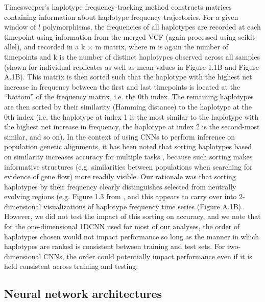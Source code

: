 Timesweeper’s haplotype frequency-tracking method constructs matrices containing information about haplotype frequency trajectories. For a given window of $l$ polymorphisms, the frequencies of all haplotypes are recorded at each timepoint using information from the merged VCF (again processed using scikit-allel), and recorded in a k × m matrix, where m is again the number of timepoints and k is the number of distinct haplotypes observed across all samples (shown for individual replicates as well as mean values in Figure 1.1B and Figure A.1B). This matrix is then sorted such that the haplotype with the highest net increase in frequency between the first and last timepoints is located at the “bottom” of the frequency matrix, i.e. the 0th index. The remaining haplotypes are then sorted by their similarity (Hamming distance) to the haplotype at the 0th index (i.e. the haplotype at index 1 is the most similar to the haplotype with the highest net increase in frequency, the haplotype at index 2 is the second-most similar, and so on). In the context of using CNNs to perform inference on population genetic alignments, it has been noted that sorting haplotypes based on similarity increases accuracy for multiple tasks \cite{flagelUnreasonableEffectivenessConvolutional2019,rayIntroUNETIdentifyingIntrogressed2023}, because such sorting makes informative structures (e.g. similarities between populations when searching for evidence of gene flow) more readily visible. Our rationale was that sorting haplotypes by their frequency clearly distinguishes selected from neutrally evolving regions (e.g. Figure 1.3 from \cite{garudRecentSelectiveSweeps2015}, and this appears to carry over into 2-dimensional visualizations of haplotype frequency time series (Figure A.1B). However, we did not test the impact of this sorting on accuracy, and we note that for the one-dimensional 1DCNN used for most of our analyses, the order of haplotypes chosen would not impact performance so long as the manner in which haplotypes are ranked is consistent between training and test sets. For two-dimensional CNNs, the order could potentially impact performance even if it is held consistent across training and testing. \\

\subsection{Neural network architectures}

